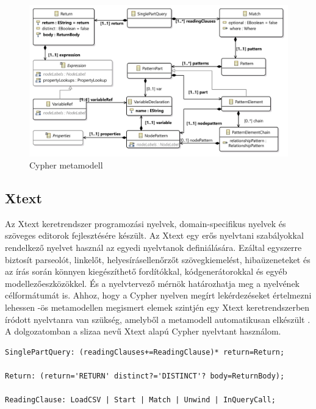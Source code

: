 \begin{figure}[htp]
	\centering
	\includegraphics[width=1\textwidth]{figures/openCypherClassDiagram}
	\caption{Cypher metamodell}
	\label{fig:cyphermetamodell}
\end{figure}


\subsection{Xtext}

Az Xtext keretrendszer programozási nyelvek,  domain-specifikus nyelvek és szöveges editorok fejlesztésére készült. Az Xtext  
egy erős nyelvtani szabályokkal rendelkező nyelvet használ az egyedi nyelvtanok definiálására. Ezáltal
egyszerre biztosít parseolót, linkelőt, helyesírásellenőrzőt szövegkiemelést, hibaüzeneteket és az írás során könnyen kiegészíthető fordítókkal, kódgenerátorokkal és egyéb modellezőeszközökkel. És a nyelvtervező mérnök határozhatja meg a nyelvének célformátumát is. Ahhoz, hogy a Cypher nyelven megírt lekérdezéseket értelmezni lehessen 
-ös metamodellen megismert elemek szintjén egy Xtext \cite{xText} keretrendszerben íródott nyelvtanra van szükség, amelyből a metamodell automatikusan elkészült . A dolgozatomban a slizaa \cite{slizaa_2018} nevű Xtext alapú Cypher nyelvtant használom.


\begin{lstlisting}[style=cyphersmall]
SinglePartQuery: (readingClauses+=ReadingClause)* return=Return;

Return: (return='RETURN' distinct?='DISTINCT'? body=ReturnBody);

ReadingClause: LoadCSV | Start | Match | Unwind | InQueryCall;
\end{lstlisting}



